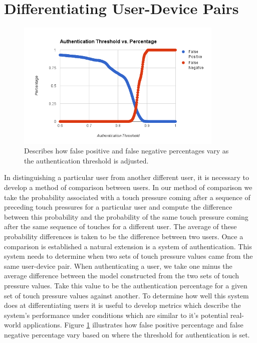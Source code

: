 \documentclass{acm_proc_article-sp}
\begin{document}
\section{Differentiating User-Device Pairs}
\label{sec:differentiation}

\begin{figure}
\centering
\includegraphics[width=3.9in]{threshold_vs_percentages.png}
\caption{Describes how false positive and false negative percentages vary as the authentication threshold is adjusted.}
\label{fig:threshold_vs_percentages}
\end{figure}

In distinguishing a particular user from another different user, it is necessary to develop a method of comparison between users. In our method of comparison we take the probability associated with a touch pressure coming after a sequence of preceding touch pressures for a particular user and compute the difference between this probability and the probability of the same touch pressure coming after the same sequence of touches for a different user. The average of these probability differences is taken to be the difference between two users.
%
Once a comparison is established a natural extension is a system of authentication. This system needs to determine when two sets of touch pressure values came from the same user-device pair. When authenticating a user, we take one minus the average difference between the model constructed from the two sets of touch pressure values. Take this value to be the authentication percentage for a given set of touch pressure values against another.
%
To determine how well this system does at differentiating users it is useful to develop metrics which describe the system's performance under conditions which are similar to it's potential real-world applications. Figure \ref{fig:threshold_vs_percentages} illustrates how false positive percentage and false negative percentage vary based on where the threshold for authentication is set. 
\end{document}
